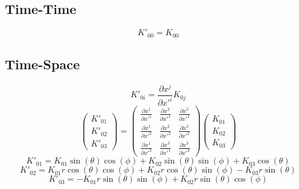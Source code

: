 \documentclass[10pt,letterpaper]{article}
\begin{document}
\subsection*{Time-Time}
\begin{equation}
K'_{00} = K_{00}
\end{equation}
\subsection*{Time-Space}
\begin{equation}
K'_{0i} = \frac{\partial x^j}{\partial x'^i}K_{0j}
\end{equation}
\begin{equation}
\renewcommand*{\arraystretch}{1.5}
\begin{pmatrix}K'_{01}\\ K'_{02}\\K'_{03} \end{pmatrix}
=
\begin{pmatrix}\frac{\partial x^1}{\partial x'^1}&\frac{\partial x^2}{\partial x'^1}&\frac{\partial x^3}{\partial x'^1}\\ \frac{\partial x^1}{\partial x'^2}&\frac{\partial x^2}{\partial x'^2}&\frac{\partial x^3}{\partial x'^2}\\
\frac{\partial x^1}{\partial x'^3}&\frac{\partial x^3}{\partial x'^1}&\frac{\partial x^3}{\partial x'^3} \end{pmatrix}
\begin{pmatrix}K_{01}\\ K_{02}\\ K_{03} \end{pmatrix}
\end{equation}
\begin{equation}
K'_{01} = K_{01} \sin (\theta ) \cos (\phi )+K_{02} \sin (\theta ) \sin (\phi )+K_{03} \cos (\theta )
\end{equation}
\begin{equation}
K'_{02} = K_{01} r \cos (\theta ) \cos (\phi )+K_{02} r \cos (\theta ) \sin (\phi )-K_{03} r \sin (\theta )
\end{equation}
\begin{equation}
K'_{03} =-K_{01} r \sin (\theta ) \sin (\phi )+K_{02} r \sin (\theta ) \cos (\phi )
\end{equation}
\end{document}
